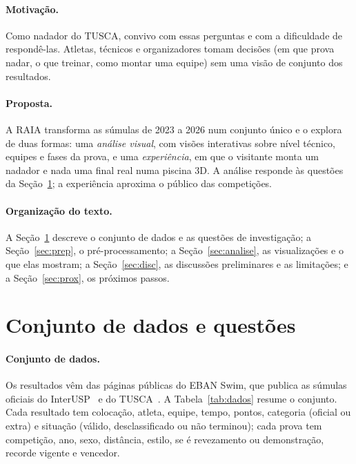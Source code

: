 \documentclass[11pt,a4paper]{article}
\begin{document}
\paragraph{Motivação.} Como nadador do TUSCA, convivo com essas perguntas e com a dificuldade de respondê-las.
Atletas, técnicos e organizadores tomam decisões (em que prova nadar, o que treinar, como montar uma equipe) sem
uma visão de conjunto dos resultados.

\paragraph{Proposta.} A RAIA transforma as súmulas de 2023 a 2026 num conjunto único e o explora de duas formas:
uma \emph{análise visual}, com visões interativas sobre nível técnico, equipes e fases da prova, e uma
\emph{experiência}, em que o visitante monta um nadador e nada uma final real numa piscina 3D. A análise responde
às questões da Seção~\ref{sec:dados}; a experiência aproxima o público das competições.

\paragraph{Organização do texto.} A Seção~\ref{sec:dados} descreve o conjunto de dados e as questões de
investigação; a Seção~\ref{sec:prep}, o pré-processamento; a Seção~\ref{sec:analise}, as visualizações e o que
elas mostram; a Seção~\ref{sec:disc}, as discussões preliminares e as limitações; e a Seção~\ref{sec:prox}, os
próximos passos.

\section{Conjunto de dados e questões}\label{sec:dados}

\paragraph{Conjunto de dados.} Os resultados vêm das páginas públicas do EBAN Swim, que publica as súmulas oficiais
do InterUSP~\cite{eban-interusp} e do TUSCA~\cite{eban-tusca}. A Tabela~\ref{tab:dados} resume o conjunto.
Cada resultado tem colocação, atleta, equipe, tempo, pontos, categoria (oficial ou extra) e situação
(válido, desclassificado ou não terminou); cada prova tem competição, ano, sexo, distância, estilo, se é
revezamento ou demonstração, recorde vigente e vencedor.
\end{document}
